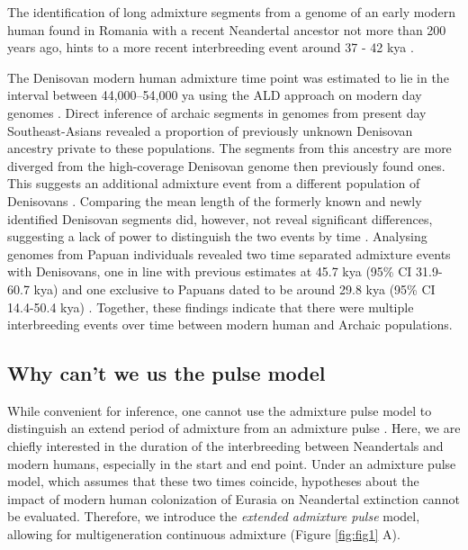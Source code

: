 \documentclass[]{article}
\begin{document}
The identification of long admixture segments from a genome of an early modern human found in Romania with a recent Neandertal ancestor not more than 200 years ago, hints to a more recent interbreeding event around 37 - 42 kya \citep{fu_early_2015}.


The Denisovan modern human admixture time point was estimated to lie in the interval between 44,000--54,000 ya using the ALD
approach on modern day genomes \citep{sankararaman_combined_2016}. 
Direct inference of archaic segments in genomes from present day Southeast-Asians revealed a proportion of previously unknown Denisovan ancestry private to these populations. The segments from this ancestry are more diverged from the high-coverage Denisovan genome then previously found ones. This suggests an additional admixture event from a different population of Denisovans \citep{browning_analysis_2018}. 
Comparing the mean length of the formerly known and newly identified Denisovan segments did, however, not reveal significant differences, suggesting a lack of power to distinguish the
two events by time \citep{browning_analysis_2018,jacobs_multiple_2019}. Analysing genomes from Papuan individuals revealed two time separated admixture events with Denisovans, one in line with previous estimates at 45.7 kya (95\% CI 31.9-60.7 kya) and one exclusive to Papuans dated to be around 29.8 kya (95\% CI 14.4-50.4 kya) \citep{jacobs_multiple_2019}. Together, these findings indicate that there were multiple interbreeding events over time between modern human and Archaic populations.


\subsection{Why can't we us the pulse model}\label{Why can't we us the pulse model}

While convenient for inference, one cannot use the admixture pulse model to distinguish an extend period of admixture from an admixture pulse \citep{pickrell_toward_2014}. Here, we are chiefly interested in the duration of the interbreeding between Neandertals and modern humans, especially in the start and end point.  Under an admixture pulse model, which assumes that these two times coincide, hypotheses about the impact of modern human colonization of Eurasia on Neandertal extinction cannot be evaluated. Therefore, we introduce the \textit{extended admixture pulse} model, allowing for multigeneration continuous admixture (Figure \ref{fig:fig1} A). 
\end{document}
